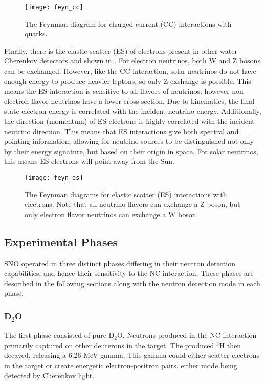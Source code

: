\begin{figure}
\centering
\texttt{[image: feyn\_cc]}
\caption{\label{fig:CC}The Feynman diagram for charged current (CC) interactions with quarks.}
\end{figure}

Finally, there is the elastic scatter (ES) of electrons present in other water Cherenkov detectors and shown in .
For electron neutrinos, both W and Z bosons can be exchanged.
However, like the CC interaction, solar neutrinos do not have enough energy to produce heavier leptons, so only Z exchange is possible.
This means the ES interaction is sensitive to all flavors of neutrinos, however non-electron flavor neutrinos have a lower cross section.
Due to kinematics, the final state electron energy is correlated with the incident neutrino energy.
Additionally, the direction (momentum) of ES electrons is highly correlated with the incident neutrino direction.
This means that ES interactions give both spectral and pointing information, allowing for neutrino sources to be distinguished not only by their energy signature, but based on their origin in space.
For solar neutrinos, this means ES electrons will point away from the Sun.

\begin{figure}
\centering
\texttt{[image: feyn\_es]}
\caption{\label{fig:ES}The Feynman diagrams for elastic scatter (ES) interactions with electrons. 
    Note that all neutrino flavors can exchange a Z boson, but only electron flavor neutrinos can exchange a W boson.}
\end{figure}


\subsection{Experimental Phases}

SNO operated in three distinct phases differing in their neutron detection capabilities, and hence their sensitivity to the NC interaction.
These phases are described in the following sections along with the neutron detection mode in each phase.

\subsubsection{D$_2$O}

The first phase consisted of pure D$_2$O. 
Neutrons produced in the NC interaction primarily captured on other deuterons in the target.
The produced $^3$H then decayed, releasing a 6.26 MeV gamma.
This gamma could either scatter electrons in the target or create energetic electron-positron pairs, either mode being detected by Cherenkov light.

